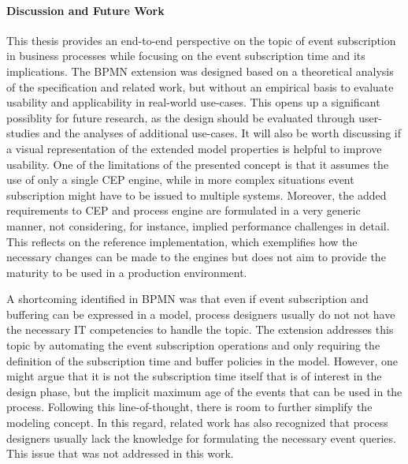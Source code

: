 \paragraph{Discussion and Future Work}
This thesis provides an end-to-end perspective on the topic of event subscription in business processes while focusing on the event subscription time and its implications.
The BPMN extension was designed based on a theoretical analysis of the specification and related work, but without an empirical basis to evaluate usability and applicability in real-world use-cases.
This opens up a significant possiblity for future research, as the design should be evaluated through user-studies and the analyses of additional use-cases. It will also be worth discussing if a visual representation of the extended model properties is helpful to improve usability.
One of the limitations of the presented concept is that it assumes the use of only a single CEP engine, while in more complex situations event subscription might have to be issued to multiple systems.
Moreover, the added requirements to CEP and process engine are formulated in a very generic manner, not considering, for instance, implied performance challenges in detail.
This reflects on the reference implementation, which exemplifies how the necessary changes can be made to the engines but does not aim to provide the maturity to be used in a production environment.

A shortcoming identified in BPMN was that even if event subscription and buffering can be expressed in a model, process designers usually do not not have the necessary IT competencies to handle the topic.
The extension addresses this topic by automating the event subscription operations and only requiring the definition of the subscription time and buffer policies in the model.
However, one might argue that it is not the subscription time itself that is of interest in the design phase, but the implicit maximum age of the events that can be used in the process. Following this line-of-thought, there is room to further simplify the modeling concept.
In this regard, related work has also recognized that process designers usually lack the knowledge for formulating the necessary event queries. This issue that was not addressed in this work.






